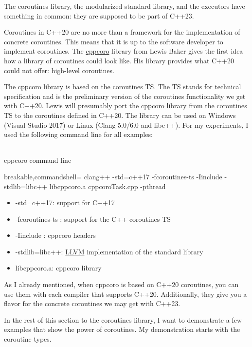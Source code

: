The coroutines library, the modularized standard library, and the executors have something in common: they are supposed to be part of C++23.



Coroutines in C++20 are no more than a framework for the implementation of concrete coroutines. This means that it is up to the software developer to implement coroutines. The \href{https://github.com/lewissbaker/cppcoro}{cppcoro} library from Lewis Baker gives the first idea how a library of coroutines could look like. His library provides what C++20 could not offer: high-level coroutines.

\begin{tcolorbox}[breakable,enhanced jigsaw,colback=blue!5!white,colframe=blue!75!black,title={Using cppcoro}]
The cppcoro library is based on the coroutines TS. The TS stands for technical specification and is the preliminary version of the coroutines functionality we get with C++20. Lewis will presumably port the cppcoro library from the coroutines TS to the coroutines defined in C++20. The library can be used on Windows (Visual Studio 2017) or Linux (Clang 5.0/6.0 and libc++). For my experiments, I used the following command line for all examples:

\hspace*{\fill} \\ %
\noindent
cppcoro command line
\begin{tcblisting}{breakable,commandshell={}}
clang++ -std=c++17 -fcoroutines-ts -Iinclude -stdlib=libc++ libcppcoro.a
  cppcoroTask.cpp -pthread
\end{tcblisting}

\begin{itemize}
\item 
-std=c++17: support for C++17

\item 
-fcoroutines-ts : support for the C++ coroutines TS

\item 
-Iinclude : cppcoro headers

\item 
-stdlib=libc++: \href{https://en.wikipedia.org/wiki/LLVM}{LLVM} implementation of the standard library

\item 
libcppcoro.a: cppcoro library
\end{itemize}

As I already mentioned, when cppcoro is based on C++20 coroutines, you can use them with each compiler that supports C++20. Additionally, they give you a flavor for the concrete coroutines we may get with C++23.

In the rest of this section to the coroutines library, I want to demonstrate a few examples that show the power of coroutines. My demonstration starts with the coroutine types.

\end{tcolorbox}

